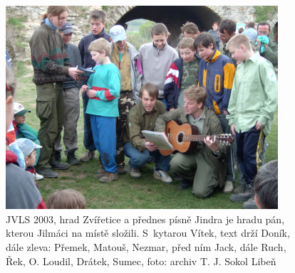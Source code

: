\documentclass[a5paper, 11pt, twoside]{article}
\begin{document}
\begin{figure}[h]
  \centering 
  \includegraphics[width=0.9\textwidth]{img/78_jilm_zviretice.JPG}
  \caption*{JVLS 2003, hrad Zvířetice a přednes písně Jindra je hradu pán,
  kterou Jilmáci na místě složili. S~kytarou Vítek, text drží Doník, dále
  zleva: Přemek, Matouš, Nezmar, před ním Jack, dále Ruch, Řek, O. Loudil,
  Drátek, Sumec, foto: archiv T. J. Sokol Libeň}
\end{figure}
\end{document}

